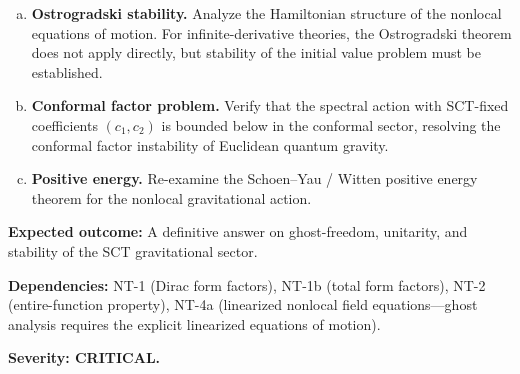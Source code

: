 \documentclass[12pt,a4paper]{article}
\newcommand{\outcome}[1]{\noindent\textbf{Expected outcome:} #1\par}
\newcommand{\deps}[1]{\noindent\textbf{Dependencies:} #1\par}
\begin{document}
{\begin{enumerate}[(a)]
  \item \textbf{Ostrogradski stability.} Analyze the Hamiltonian structure of
    the nonlocal equations of motion. For infinite-derivative theories, the
    Ostrogradski theorem does not apply directly, but stability of the initial
    value problem must be established.
  \item \textbf{Conformal factor problem.} Verify that the spectral action
    with SCT-fixed coefficients $(c_1, c_2)$ is bounded below in the
    conformal sector, resolving the conformal factor instability of Euclidean
    quantum gravity.
  \item \textbf{Positive energy.} Re-examine the Schoen--Yau / Witten positive
    energy theorem for the nonlocal gravitational action.
\end{enumerate}
}

\outcome{A definitive answer on ghost-freedom, unitarity, and stability of
the SCT gravitational sector.}

\deps{NT-1 (Dirac form factors), NT-1b (total form factors), NT-2
(entire-function property), NT-4a (linearized nonlocal field equations---ghost analysis
requires the explicit linearized equations of motion).}

\textbf{Severity: CRITICAL.}
\end{document}
